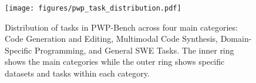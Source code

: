 \begin{figure}[t]
    \centering
    \texttt{[image: figures/pwp\_task\_distribution.pdf]}
    \caption{Distribution of tasks in PWP-Bench across four main categories: Code Generation and Editing, Multimodal Code Synthesis, Domain-Specific Programming, and General SWE Tasks. The inner ring shows the main categories while the outer ring shows specific datasets and tasks within each category.}
    \label{fig:task_distribution}
\end{figure} 
